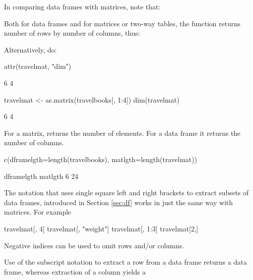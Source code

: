 In comparing data frames with matrices, note that:
\begin{itemizz}
\item Both for data frames and for matrices or two-way tables,
the function  returns number of rows by number of columns,
thus:
\begin{marginfigure}
Alternatively, do:
\begin{Schunk}
\begin{Sinput}
attr(travelmat, "dim")
\end{Sinput}
\begin{Soutput}
[1] 6 4
\end{Soutput}
\end{Schunk}
\end{marginfigure}
\begin{Schunk}
\begin{Sinput}
travelmat <- as.matrix(travelbooks[, 1:4])
dim(travelmat)
\end{Sinput}
\begin{Soutput}
[1] 6 4
\end{Soutput}
\end{Schunk}
\item {}
  For a matrix,  returns the number of elements.
For a data frame it returns the number of columns.
\begin{Schunk}
\begin{Sinput}
c(dframelgth=length(travelbooks),
  matlgth=length(travelmat))
\end{Sinput}
\begin{Soutput}
dframelgth    matlgth 
         6         24 
\end{Soutput}
\end{Schunk}
\item The notation that uses single square left and right brackets
to extract subsets of data frames, introduced in Section \ref{sec:df}
works in just the same way with matrices.  For example
\begin{Schunk}
\begin{Sinput}
travelmat[, 4]
travelmat[, "weight"]
travelmat[, 1:3]
travelmat[2,]
\end{Sinput}
\end{Schunk}
Negative indices can be used to omit rows and/or columns.
\item Use of the subscript notation to extract a row from a data
frame returns a data frame, whereas extraction of a column yields a

\end{itemizz}
